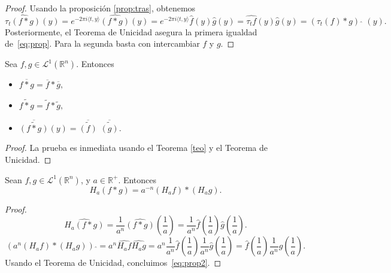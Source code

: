 \begin{proof}
Usando la proposición \ref{prop:tras}, obtenemos
\begin{equation}
    \widehat{\tau_t(f*g)}(y) = e^{-2 \pi i \langle t, y \rangle}\widehat{(f*g)}(y) = e^{-2 \pi i \langle t, y \rangle}\widehat{f}(y)\widehat{g}(y) =\widehat{\tau_tf}(y)\widehat{g}(y) =  
    (\tau_t(f)*g) \,\,\widehat{}\,\,(y).
\end{equation}  
Posteriormente, el Teorema de Unicidad asegura la primera igualdad de~\eqref{eq:prop}. Para la segunda basta con intercambiar $f$ y $g$.
\end{proof}



\begin{proposicion}
     Sea $f,g \in \mathscr{L}^1(\mathbb{R}^n)$. Entonces 
     \begin{itemize}
         \item $\overline{f*g}=\overline{f}*\overline{g},$
         \item $\widetilde{f*g}=\widetilde{f}*\widetilde{g},$
         \item ${\overline{\widetilde{(f*g)}}}(y) = {\overline{\widetilde{(f)}}}\,\,{\overline{\widetilde{(g)}}}.$
     \end{itemize}
\end{proposicion}
\begin{proof}
    La prueba es inmediata usando el Teorema \ref{teo} y el Teorema de Unicidad.
\end{proof}

\begin{proposicion}
     Sean $f,g \in \mathscr{L}^1(\mathbb{R}^n)$, y $a \in \mathbb{R}^+$. Entonces 
     \begin{equation}\label{eq:prop2}
         H_a(f*g) = a^{-n}(H_af)*(H_ag).
     \end{equation}
\end{proposicion}

\begin{proof}

\begin{equation}
    \widehat{H_a(f*g)} = \frac{1}{a^n}\widehat{(f*g)}\left(\frac{1}{a}\right) = \frac{1}{a^n}\widehat{f}\left(\frac{1}{a}\right)\widehat{g}\left(\frac{1}{a}\right). 
\end{equation}
\begin{equation}
    (a^n(H_af)*(H_ag))\, \, \widehat{} = a^n\widehat{H_af}\widehat{H_ag} = a^n\frac{1}{a^n}\widehat{f}\left(\frac{1}{a}\right)\frac{1}{a^n}\widehat{g}\left(\frac{1}{a}\right) = \widehat{f}\left(\frac{1}{a}\right)\frac{1}{a^n}\widehat{g}\left(\frac{1}{a}\right).
\end{equation}
Usando el Teorema de Unicidad, concluimos~\eqref{eq:prop2}.
\end{proof}


